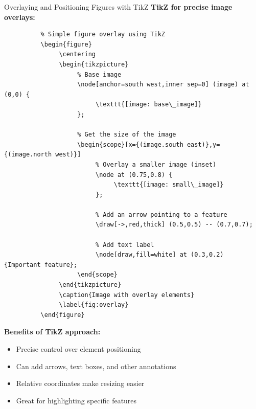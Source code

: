 \begin{frame}[fragile]{Overlaying and Positioning Figures with TikZ}
     \textbf{TikZ for precise image overlays:}
     \begin{lstlisting}
          % Simple figure overlay using TikZ
          \begin{figure}
               \centering
               \begin{tikzpicture}
                    % Base image
                    \node[anchor=south west,inner sep=0] (image) at (0,0) {
                         \texttt{[image: base\_image]}
                    };
                    
                    % Get the size of the image
                    \begin{scope}[x={(image.south east)},y={(image.north west)}]
                         % Overlay a smaller image (inset)
                         \node at (0.75,0.8) {
                              \texttt{[image: small\_image]}
                         };
                         
                         % Add an arrow pointing to a feature
                         \draw[->,red,thick] (0.5,0.5) -- (0.7,0.7);
                         
                         % Add text label
                         \node[draw,fill=white] at (0.3,0.2) {Important feature};
                    \end{scope}
               \end{tikzpicture}
               \caption{Image with overlay elements}
               \label{fig:overlay}
          \end{figure}
     \end{lstlisting}
     
     \textbf{Benefits of TikZ approach:}
     \begin{itemize}
          \item Precise control over element positioning
          \item Can add arrows, text boxes, and other annotations
          \item Relative coordinates make resizing easier
          \item Great for highlighting specific features
     \end{itemize}
\end{frame}

